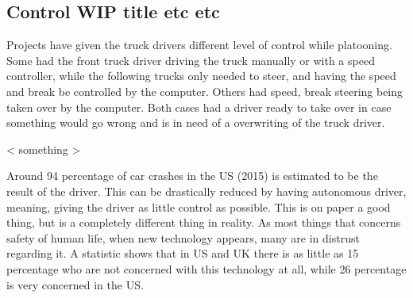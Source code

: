 \subsection{Control WIP title etc etc}
Projects have given the truck drivers different level of control while platooning. Some had the front truck driver driving the truck manually or with a speed controller, while the following trucks only needed to steer, and having the speed and break be controlled by the computer. Others had speed, break steering being taken over by the computer. Both cases had a driver ready to take over in case something would go wrong and is in need of a overwriting of the truck driver.\par
% 
\par
< something > 
\par
% 
Around 94 percentage of car crashes in the US (2015) is estimated to be the result of the driver. This can be drastically reduced by having autonomous driver, meaning, giving the driver as little control as possible. This is on paper a good thing, but is a completely different thing in reality. As most things that concerns safety of human life, when new technology appears, many are in distrust regarding it. A statistic shows that in US and UK there is as little as 15 percentage who are not concerned with this technology at all, while 26 percentage is very concerned in the US. 
